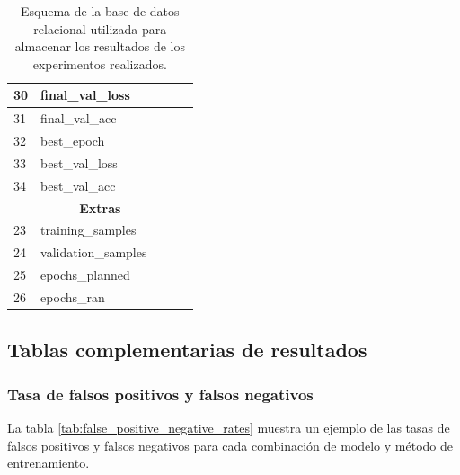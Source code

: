 \begin{table}[H]
\begin{tabular}{|l|l|l|l|}
    30             & final\_val\_loss         & ~                        & ~                    \\ \hline
    31             & final\_val\_acc          & ~                        & ~                    \\ \hline
    32             & best\_epoch              & ~                        & ~                    \\ \hline
    33             & best\_val\_loss          & ~                        & ~                    \\ \hline
    34             & best\_val\_acc           & ~                        & ~                    \\ \hline
    \multicolumn{4}{|c|}{\textbf{Extras}}                                                       \\ \hline
    23             & training\_samples        & ~                        & ~                    \\ \hline
    24             & validation\_samples      & ~                        & ~                    \\ \hline
    25             & epochs\_planned          & ~                        & ~                    \\ \hline
    26             & epochs\_ran              & ~                        & ~                    \\ \hline
  \end{tabular}
  \caption{Esquema de la base de datos relacional utilizada para almacenar los resultados de los experimentos realizados.}
  \label{tab:db_schema}
\end{table}

\newpage

\subsection{Tablas complementarias de resultados}\label{sec:anexo_graficas}


\subsubsection{Tasa de falsos positivos y falsos negativos}
La tabla \ref{tab:false_positive_negative_rates} muestra un ejemplo de  las tasas de falsos positivos y falsos negativos para cada combinación de modelo y método de entrenamiento.

